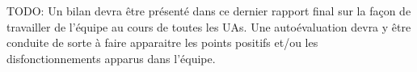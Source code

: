 TODO: 
Un bilan devra être présenté dans ce dernier rapport final sur la façon de
travailler de l'équipe au cours de toutes les UAs. Une autoévaluation devra y
être conduite de sorte à faire apparaitre les points positifs et/ou les
disfonctionnements apparus dans l'équipe.

